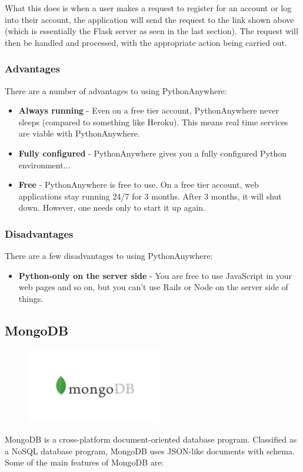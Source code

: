 What this does is when a user makes a request to register for an account or log into their account, the application will send the request to the link shown above (which is essentially the Flask server as seen in the last section). The request will then be handled and processed, with the appropriate action being carried out.

\newpage
\subsubsection{Advantages}
There are a number of advantages to using PythonAnywhere:

\begin{itemize}
    \item \textbf{Always running} - Even on a free tier account, PythonAnywhere
    never sleeps (compared to something like Heroku). This means real time 
    services are viable with PythonAnywhere.
    \item \textbf{Fully configured} - PythonAnywhere gives you a fully
    configured Python environment...
    \item \textbf{Free} - PythonAnywhere is free to use. On a free tier account,
    web applications stay running 24/7 for 3 months. After 3 months, it will
    shut down. However, one needs only to start it up again.
\end{itemize}

\subsubsection{Disadvantages}
There are a few disadvantages to using PythonAnywhere:

\begin{itemize}
    \item \textbf{Python-only on the server side} - You are free to use
    JavaScript in your web pages and so on, but you can't use Rails or Node on 
    the server side of things.
\end{itemize}

\newpage
\subsection{MongoDB}
\par
\medskip
\begin{center}
    \includegraphics[width=8cm,height=3.3cm,keepaspectratio]{images/mongodb}
\end{center}
MongoDB is a cross-platform document-oriented database program. Classified as a
NoSQL database program, MongoDB uses JSON-like documents with schema. Some of 
the main features of MongoDB are:

